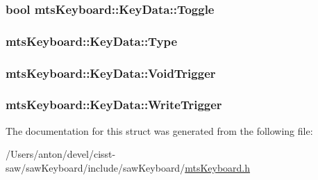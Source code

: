 \subsubsection[{Toggle}]{\setlength{\rightskip}{0pt plus 5cm}bool mts\+Keyboard\+::\+Key\+Data\+::\+Toggle}\label{structmts_keyboard_1_1_key_data_a7a7e12ddde72dfaa2f297a3a706d79e6}
\hypertarget{structmts_keyboard_1_1_key_data_ab2b6df8b50b8ada66a61e6412644e0d3}{}
\subsubsection[{Type}]{ mts\+Keyboard\+::\+Key\+Data\+::\+Type}\label{structmts_keyboard_1_1_key_data_ab2b6df8b50b8ada66a61e6412644e0d3}
\hypertarget{structmts_keyboard_1_1_key_data_a560e2370eb7f17e4c784e81d228e514a}{}
\subsubsection[{Void\+Trigger}]{ mts\+Keyboard\+::\+Key\+Data\+::\+Void\+Trigger}\label{structmts_keyboard_1_1_key_data_a560e2370eb7f17e4c784e81d228e514a}
\hypertarget{structmts_keyboard_1_1_key_data_a564f0bb039d8cd597235a73b9f06cf4c}{}
\subsubsection[{Write\+Trigger}]{ mts\+Keyboard\+::\+Key\+Data\+::\+Write\+Trigger}\label{structmts_keyboard_1_1_key_data_a564f0bb039d8cd597235a73b9f06cf4c}


The documentation for this struct was generated from the following file\+:\begin{DoxyCompactItemize}
\item 
/\+Users/anton/devel/cisst-\/saw/saw\+Keyboard/include/saw\+Keyboard/\hyperlink{mts_keyboard_8h}{mts\+Keyboard.\+h}\end{DoxyCompactItemize}
